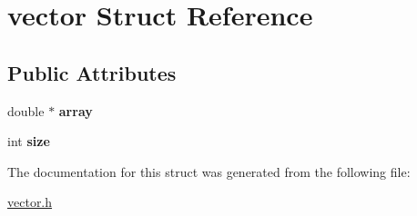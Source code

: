 \hypertarget{structvector}{}\section{vector Struct Reference}
\label{structvector}
\subsection*{Public Attributes}
\begin{DoxyCompactItemize}
\item 
\mbox{\label{structvector_aacafbacd712bffb74554a19b617a4c3d}} 
double $\ast$ {\bfseries array}
\item 
\mbox{\label{structvector_a211c6f9096b87e1ff8b09ad5ad373e61}} 
int {\bfseries size}
\end{DoxyCompactItemize}


The documentation for this struct was generated from the following file\+:\begin{DoxyCompactItemize}
\item 
\hyperlink{vector_8h}{vector.\+h}\end{DoxyCompactItemize}
